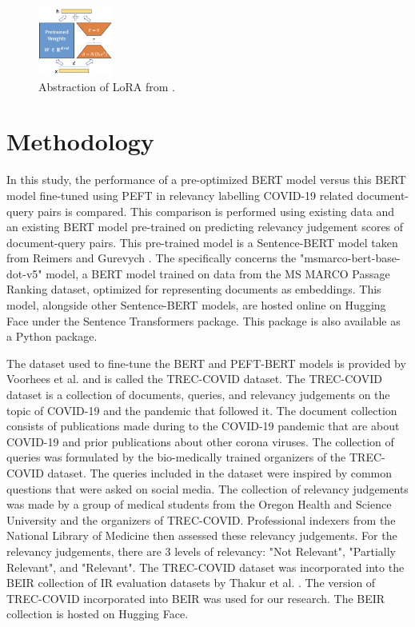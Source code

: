\documentclass[sigconf, natbib=true]{acmart}
\begin{document}
\begin{figure}[H]
    \centering
    \includegraphics[width=0.22\textwidth]{Images/peft.png}
    \caption{Abstraction of LoRA from \citeauthor{hu2022lora} \cite{hu2022lora}.}
    \label{fig:lora}
\end{figure}

\section{Methodology}
\label{sec:approach}
In this study, the performance of a pre-optimized BERT model versus this BERT model fine-tuned using PEFT in relevancy labelling COVID-19 related document-query pairs is compared.
This comparison is performed using existing data and an existing BERT model pre-trained on predicting relevancy judgement scores of document-query pairs.
This pre-trained model is a Sentence-BERT model taken from Reimers and Gurevych \cite{reimers2019sentencebert}.
The specifically concerns the "msmarco-bert-base-dot-v5" model, a BERT model trained on data from the MS MARCO Passage Ranking dataset, optimized for representing documents as embeddings.
This model, alongside other Sentence-BERT models, are hosted online on Hugging Face under the Sentence Transformers package.
This package is also available as a Python package.

The dataset used to fine-tune the BERT and PEFT-BERT models is provided by Voorhees et al. \cite{voorhees2021trec} and is called the TREC-COVID dataset.
The TREC-COVID dataset is a collection of documents, queries, and relevancy judgements on the topic of COVID-19 and the pandemic that followed it.
The document collection consists of publications made during to the COVID-19 pandemic that are about COVID-19 and prior publications about other corona viruses.
The collection of queries was formulated by the bio-medically trained organizers of the TREC-COVID dataset.
The queries included in the dataset were inspired by common questions that were asked on social media.
The collection of relevancy judgements was made by a group of medical students from the Oregon Health and Science University and the organizers of TREC-COVID.
Professional indexers from the National Library of Medicine then assessed these relevancy judgements.
For the relevancy judgements, there are 3 levels of relevancy: "Not Relevant", "Partially Relevant", and "Relevant".
The TREC-COVID dataset was incorporated into the BEIR collection of IR evaluation datasets by Thakur et al. \cite{thakur2021beir}.
The version of TREC-COVID incorporated into BEIR was used for our research.
The BEIR collection is hosted on Hugging Face.
\end{document}
